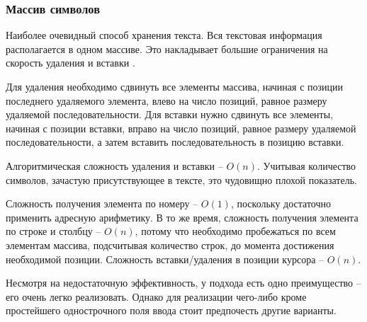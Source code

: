 \documentclass{fefu}
\begin{document}
			\subsubsection{Массив символов}
				\par Наиболее очевидный способ хранения текста. Вся текстовая информация
				располагается в одном массиве. Это накладывает большие ограничения на скорость
				удаления и вставки \cite{StringsReference}. 
				\par Для удаления необходимо сдвинуть все элементы массива, начиная с позиции
				последнего удаляемого элемента, влево на число позиций, равное размеру
				удаляемой последовательности. Для вставки нужно сдвинуть все элементы, начиная
				с позиции вставки, вправо на число позиций, равное размеру удаляемой
				последовательности, а затем вставить последовательность в позицию вставки.
				\par Алгоритмическая сложность удаления и вставки -- $O(n)$. Учитывая 
				количество символов, зачастую присутствующее в тексте, это чудовищно плохой 
				показатель.
				\par Сложность получения элемента по номеру -- $O(1)$, поскольку достаточно
				применить адресную арифметику. В то же время, сложность получения элемента по
				строке и столбцу -- $O(n)$, потому что необходимо пробежаться по всем элементам
				массива, подсчитывая количество строк, до момента достижения необходимой
				позиции. Сложность вставки/удаления в позиции курсора -- $O(n)$.
				\par Несмотря на недостаточную эффективность, у подхода есть одно преимущество
				-- его очень легко реализовать. Однако для реализации чего-либо кроме
				простейшего однострочного поля ввода стоит предпочесть другие варианты.
\end{document}
